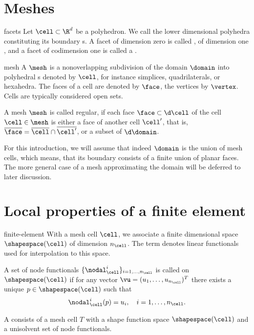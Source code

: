 \section{Meshes}

\begin{Definition}{facets}
  Let $\cell\subset \R^d$ be a polyhedron. We call the lower
  dimensional polyhedra constituting its boundary s. A
  facet of dimension zero is called , of dimension one
  , and a facet of codimension one is called a
  .
\end{Definition}

\begin{Definition}{mesh}
  A  $\mesh$ is a nonoverlapping subdivision of the
  domain $\domain$ into polyhedral s denoted by $\cell$,
  for instance simplices, quadrilaterals, or hexahedra. The
  faces of a cell are denoted by $\face$, the
  vertices by $\vertex$. Cells are typically considered open sets.

  A mesh $\mesh$ is called regular, if each face
  $\face \subset \d\cell$ of the cell $\cell\in\mesh$ is either a
  face of another cell $\cell^\prime$, that is,
  $\overline{\face} = \overline{\cell} \cap \overline{\cell^\prime}$,
  or a subset of $\d\domain$.
\end{Definition}

\begin{remark}
  For this introduction, we will assume that indeed $\domain$ is the
  union of mesh cells, which means, that its boundary consists of a
  finite union of planar faces. The more general case of a mesh
  approximating the domain will be deferred to later discussion.
\end{remark}


\section{Local properties of a finite element}

\begin{Definition}{finite-element}
  With a mesh cell $\cell$, we associate a finite dimensional
   space $\shapespace(\cell)$ of dimension
  $n_\cell$. The term  denotes linear
  functionals used for interpolation to this space.

  A set of node functionals $\{\nodal_\cell^i\}_{i=1,\dots,n_\cell}$ is called
   on $\shapespace(\cell)$ if for any vector
  $\vu = (u_1,\dots,u_{n_\cell})^T$ there exists a unique
  $p\in \shapespace(\cell)$ such that
  \begin{gather}
    \nodal_\cell^i(p) = u_i,\quad i=1,\dots,n_\cell.
  \end{gather}

  A  consists of a mesh cell $T$ with a shape
  function space $\shapespace(\cell)$ and a unisolvent set of node
  functionals.
\end{Definition}


